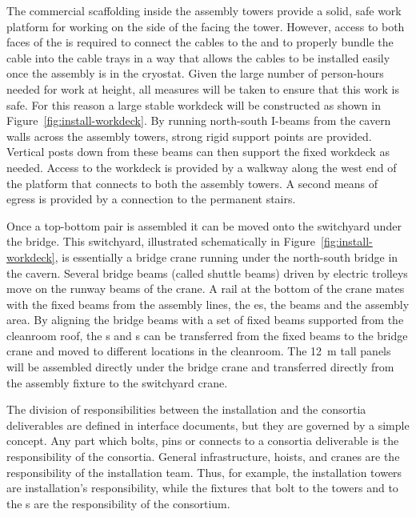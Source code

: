 The commercial scaffolding inside the  assembly towers 
provide a solid, safe work platform for working on the side of the  facing the tower. However, access to both faces of the  is required to connect the cables to the  and to properly bundle the cable into the cable trays in a way that allows the cables to be installed easily once the assembly is in the cryostat. 
Given the large number of person-hours needed for work at height, all measures will be taken to ensure that this work is safe. 
For this reason a large stable  workdeck will be constructed as shown in Figure~\ref{fig:install-workdeck}.
By running north-south I-beams from the cavern walls across the assembly towers, strong rigid support points are provided. 
Vertical posts down from these beams can then support the fixed workdeck as needed. Access to the workdeck is provided by a walkway along the west end of the platform that connects to both the assembly towers. A second means of egress is provided by a connection to the permanent stairs. 



Once a top-bottom  pair is assembled it can be moved onto the switchyard under the bridge. 
This switchyard, illustrated schematically in Figure~\ref{fig:install-workdeck}, is essentially a bridge crane running under the north-south bridge in the cavern.  
Several bridge beams (called shuttle beams) driven by electric trolleys  move on the runway beams of the crane.  
A rail at the bottom of the crane mates with the fixed beams  from the assembly lines, the \coldbox{}es, the  beams and the  assembly area.
By aligning the bridge beams with a set of fixed beams supported from the cleanroom roof, the s and s can be transferred from the fixed beams to the bridge crane and moved to different locations in the cleanroom. 
The \SI{12}{m} tall  panels will be assembled directly under the bridge crane and transferred directly from the assembly fixture to the switchyard crane.

The division of responsibilities between the installation and the consortia deliverables are defined in interface documents, but they are governed by a simple concept. Any part which bolts, pins or connects to a consortia deliverable is the responsibility of the consortia. General infrastructure, hoists, and cranes are the responsibility of the installation team. Thus, for example, the installation towers are installation's responsibility, while the fixtures that bolt to the towers and to the s are the responsibility of the  consortium. 


